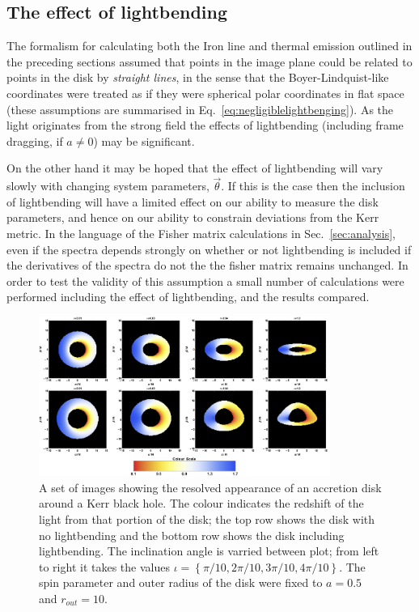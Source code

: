\subsection{The effect of lightbending}\label{subsec:lightbendingcalcs}
The formalism for calculating both the Iron line and thermal emission outlined in the preceding sections assumed that points in the image plane could be related to points in the disk by \emph{straight lines}, in the sense that the Boyer-Lindquist-like coordinates were treated as if they were spherical polar coordinates in flat space (these assumptions are summarised in Eq.\ \ref{eq:negligiblelightbenging}). As the light originates from the strong field the effects of lightbending (including frame dragging, if $a\neq 0$) may be significant. 

On the other hand it may be hoped that the effect of lightbending will vary slowly with changing system parameters, $\vec{\theta}$. If this is the case then the inclusion of lightbending will have a limited effect on our ability to measure the disk parameters, and hence on our ability to constrain deviations from the Kerr metric. In the language of the Fisher matrix calculations in Sec.\ \ref{sec:analysis}, even if the spectra depends strongly on whether or not lightbending is included if the derivatives of the spectra do not the the fisher matrix remains unchanged. In order to test the validity of this assumption a small number of calculations were performed including the effect of lightbending, and the results compared.

\begin{figure}[t]
 \centering
 \includegraphics[trim=0cm 0cm 0cm 0cm, width=0.85\textwidth]{LightBendingDisk.png}
 \caption{A set of images showing the resolved appearance of an accretion disk around a Kerr black hole. The colour indicates the redshift of the light from that portion of the disk; the top row shows the disk with no lightbending and the bottom row shows the disk including lightbending. The inclination angle is varried between plot; from left to right it takes the values $\iota =\left\{\pi /10 , 2\pi /10 , 3\pi /10 , 4\pi /10 \right\}$. The spin parameter and outer radius of the disk were fixed to $a=0.5$ and $r_{out}=10$.}
 \label{fig:LightBendingDisk}
\end{figure}

